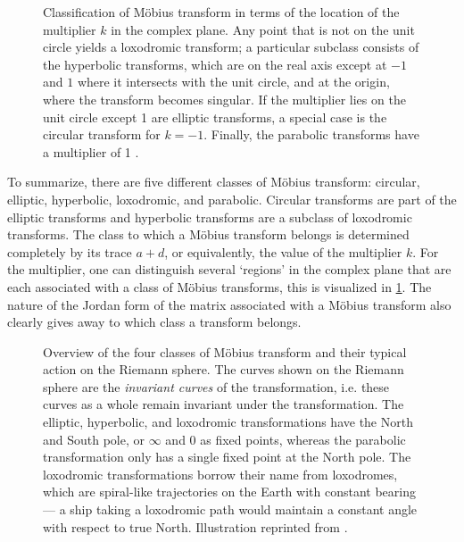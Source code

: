 
\begin{figure}
    \centering
     
    \caption{Classification of Möbius transform in terms of the location of the multiplier \(k\) in the complex plane. Any point that is not on the unit circle yields a loxodromic transform; a particular subclass consists of the hyperbolic transforms, which are on the real axis except at \(-1\) and \(1\) where it intersects with the unit circle, and at the origin, where the transform becomes singular. If the multiplier lies on the unit circle except 1 are elliptic transforms, a special case is the circular transform for \(k = -1\). Finally, the parabolic transforms have a multiplier of 1 \cite{Needham1997}.}
    \label{fig:multiplier_regions}
\end{figure}
To summarize, there are five different classes of Möbius transform: circular, elliptic, hyperbolic, loxodromic, and parabolic. Circular transforms are part of the elliptic transforms and hyperbolic transforms are a subclass of loxodromic transforms. The class to which a Möbius transform belongs is determined completely by its trace \(a + d\), or equivalently, the value of the multiplier \(k\). For the multiplier, one can distinguish several `regions' in the complex plane that are each associated with a class of Möbius transforms, this is visualized in \cref{fig:multiplier_regions}. The nature of the Jordan form of the matrix associated with a Möbius transform also clearly gives away to which class a transform belongs. 
\begin{figure}
    \centering
    
    \caption{Overview of the four classes of Möbius transform and their typical action on the Riemann sphere. The curves shown on the Riemann sphere are the \emph{invariant curves} of the transformation, i.e. these curves as a whole remain invariant under the transformation. The elliptic, hyperbolic, and loxodromic transformations have the North and South pole, or \(\infty\) and 0 as fixed points, whereas the parabolic transformation only has a single fixed point at the North pole. The loxodromic transformations borrow their name from loxodromes, which are spiral-like trajectories on the Earth with constant bearing --- a ship taking a loxodromic path would maintain a constant angle with respect to true North. Illustration reprinted from \citet[p. 78]{Needham2021}.}
    \label{fig:riemann_transforms}
\end{figure}

